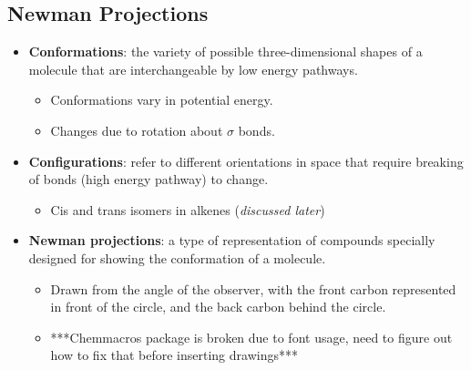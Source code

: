\documentclass[12pt,a4paper]{article}
\begin{document}
\subsection{Newman Projections}
\begin{itemize}
    \item \textbf{Conformations}: the variety of possible three-dimensional shapes of a molecule that are interchangeable by low energy pathways.
        \begin{itemize}
            \item Conformations vary in potential energy.
            \item Changes due to rotation about $\sigma$ bonds.
        \end{itemize}
    \item \textbf{Configurations}: refer to different orientations in space that require breaking of bonds (high energy pathway) to change.
        \begin{itemize}
            \item Cis and trans isomers in alkenes (\textit{discussed later})
        \end{itemize}
    \item \textbf{Newman projections}: a type of representation of compounds specially designed for showing the conformation of a molecule.
        \begin{itemize}
            \item Drawn from the angle of the observer, with the front carbon represented in front of the circle, and the back carbon behind the circle.
            \item ***Chemmacros package is broken due to font usage, need to figure out how to fix that before inserting drawings***
        \end{itemize}

\end{itemize}
\end{document}
